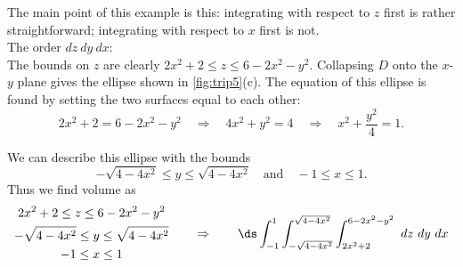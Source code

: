 {The main point of this example is this: integrating with respect to $z$ first is rather straightforward; integrating with respect to $x$ first is not.\\

\noindent The order $dz\ dy\ dx$:\\

The bounds on $z$ are clearly $2x^2+2\leq z\leq 6-2x^2-y^2$. Collapsing $D$ onto the $x$-$y$ plane gives the ellipse shown in \autoref{fig:trip5}(c). The equation of this ellipse is found by setting the two surfaces equal to each other: 
$$2x^2+2 = 6-2x^2-y^2\quad \Rightarrow\quad 4x^2+y^2=4\quad \Rightarrow\quad x^2+\frac{y^2}4=1.$$


We can describe this ellipse with the bounds 
\[-\sqrt{4-4x^2} \leq y\leq \sqrt{4-4x^2}\quad \text{and}\quad -1\leq x\leq 1.\]
Thus we find volume as
\[
	\begin{gathered}
		2x^2+2\leq z\leq 6-2x^2-y^2\\
		-\sqrt{4-4x^2}\leq y\leq \sqrt{4-4x^2}\\
		-1\leq x\leq 1
	\end{gathered} 
	\qquad\Rightarrow\qquad
	\ds\int_{-1}^1\int_{-\sqrt{4-4x^2}}^{\sqrt{4-4x^2}}\int_{2x^2+2}^{6-2x^2-y^2}\ dz\ dy\ dx 
\]

}
